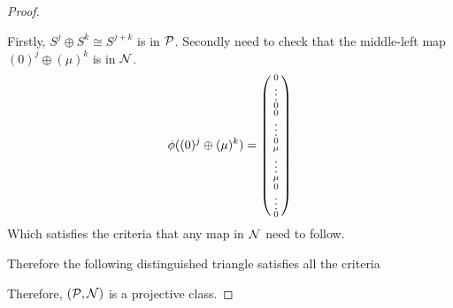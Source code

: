 \begin{proof}
\begin{enumerate}
{            Firstly, \( S^j \oplus S^k \cong S^{j + k} \) is in \( {\mathcal{P}} \). Secondly need to check that the middle-left map \( (0)^j \oplus ( \mu )^k \) is in \( {\mathcal{N}} \).
            \[
                \phi((0)^j \oplus ( \mu )^k) =
                \begin{psmallmatrix}
                    0 \\
                    \vdots \\
                    0 \\
                    0 \\
                    \vdots \\
                    0 \\
                    \mu \\
                    \vdots \\
                    \mu \\
                    0 \\
                    \vdots \\
                    0
                \end{psmallmatrix}
            \]
            Which satisfies the criteria that any map in \( {\mathcal{N}} \) need to follow.

            Therefore the following distinguished triangle satisfies all the criteria
            \begin{center}
            \end{center}
        }
    \end{enumerate}
    Therefore, \( ({\mathcal{P}}, {\mathcal{N}}) \) is a projective class.
\end{proof}